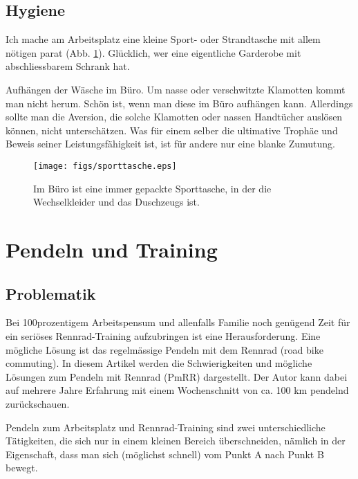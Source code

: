 \documentclass[a4paper,DIV13,BCOR1cm]{scrbook}
\begin{document}
\section{Hygiene}

Ich mache am Arbeitsplatz eine kleine Sport- oder Strandtasche mit allem nötigen parat (Abb. \ref{fig:sporttasche}).
Glücklich, wer eine eigentliche Garderobe mit abschliessbarem Schrank hat.

Aufhängen der Wäsche im Büro.
Um nasse oder verschwitzte Klamotten kommt man nicht herum.
Schön ist, wenn man diese im Büro aufhängen kann.
Allerdings sollte man die Aversion, die solche Klamotten oder nassen Handtücher auslösen können, nicht unterschätzen.
Was für einem selber die ultimative Trophäe und Beweis seiner Leistungsfähigkeit ist, ist für andere nur eine blanke Zumutung.

\begin{figure}[htpb]
        \centering
        \texttt{[image: figs/sporttasche.eps]}
        \caption{Im Büro ist eine immer gepackte Sporttasche, in der die Wechselkleider und das Duschzeugs ist.}
        \label{fig:sporttasche}
\end{figure}
\chapter{Pendeln und Training}


\section{Problematik}

Bei 100prozentigem Arbeitspensum und allenfalls Familie noch genügend Zeit
für ein seriöses Rennrad-Training aufzubringen ist eine Herausforderung.
Eine mögliche Lösung ist das regelmässige Pendeln mit dem Rennrad (road
bike commuting). In diesem Artikel werden die Schwierigkeiten und mögliche
Lösungen zum Pendeln mit Rennrad (PmRR) dargestellt. Der Autor kann dabei
auf mehrere Jahre Erfahrung mit einem Wochenschnitt von ca. 100 km pendelnd
zurückschauen.

Pendeln zum Arbeitsplatz und Rennrad-Training sind zwei unterschiedliche
Tätigkeiten, die sich nur in einem kleinen Bereich überschneiden, nämlich
in der Eigenschaft, dass man sich (möglichst schnell) vom Punkt A nach Punkt
B bewegt.
\end{document}
